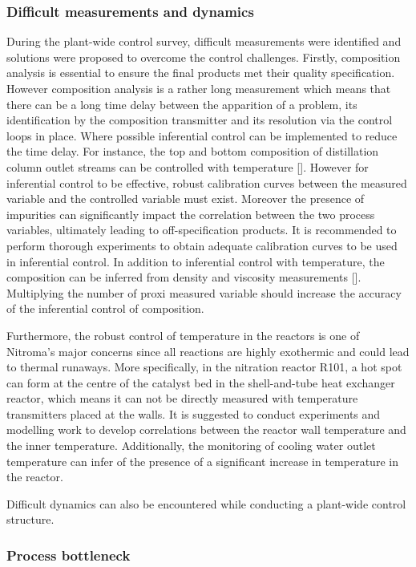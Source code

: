 \subsubsection{Difficult measurements and dynamics} %
During the plant-wide control survey, difficult measurements were identified and solutions were proposed to overcome the control challenges. Firstly, composition analysis is essential to ensure the final products met their quality specification. However composition analysis is a rather long measurement which means that there can be a long time delay between the apparition of a problem, its identification by the composition transmitter and its resolution via the control loops in place. Where possible inferential control can be implemented to reduce the time delay. For instance, the top and bottom composition of distillation column outlet streams can be controlled with temperature []. However for inferential control to be effective, robust calibration curves between the measured variable and the controlled variable must exist. Moreover the presence of impurities can significantly impact the correlation between the two process variables, ultimately leading to off-specification products. It is recommended to perform thorough experiments to obtain adequate calibration curves to be used in inferential control. In addition to inferential control with temperature, the composition can be inferred from density and viscosity measurements []. Multiplying the number of proxi measured variable should increase the accuracy of the inferential control of composition.

Furthermore, the robust control of temperature in the reactors is one of Nitroma's major concerns since all reactions are highly exothermic and could lead to thermal runaways. More specifically, in the nitration reactor R101, a hot spot can form at the centre of the catalyst bed in the shell-and-tube heat exchanger reactor, which means it can not be directly measured with temperature transmitters placed at the walls. It is suggested to conduct experiments and modelling work to develop correlations between the reactor wall temperature and the inner temperature. Additionally, the monitoring of cooling water outlet temperature can infer of the presence of a significant increase in temperature in the reactor.

Difficult dynamics can also be encountered while conducting a plant-wide control structure.


\subsubsection{Process bottleneck} %



